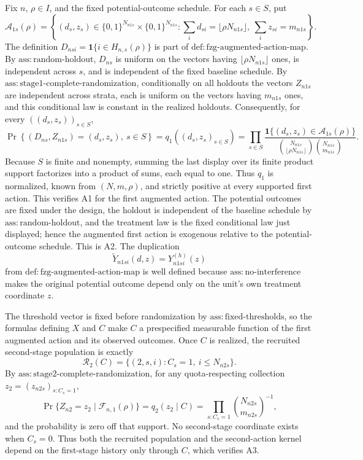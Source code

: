 Fix \(n\), \(\rho\in I\), and the fixed potential-outcome schedule.  For each \(s\in S\), put
\[
\mathcal A_{1s}(\rho)=\left\{(d_s,z_s)\in\{0,1\}^{N_{n1s}}\times\{0,1\}^{N_{n1s}}:
\sum_i d_{si}=\lfloor\rho N_{n1s}\rfloor,
\ \sum_i z_{si}=m_{n1s}\right\}.
\]
The definition \(D_{nsi}=\mathbf 1\{i\in H_{n,s}(\rho)\}\) is part of \(\mathrm{def{:}fzg\mbox{-}augmented\mbox{-}action\mbox{-}map}\).  By \(\mathrm{ass{:}random\mbox{-}holdout}\), \(D_{ns}\) is uniform on the vectors having \(\lfloor\rho N_{n1s}\rfloor\) ones, is independent across \(s\), and is independent of the fixed baseline schedule.  By \(\mathrm{ass{:}stage1\mbox{-}complete\mbox{-}randomization}\), conditionally on all holdouts the vectors \(Z_{n1s}\) are independent across strata, each is uniform on the vectors having \(m_{n1s}\) ones, and this conditional law is constant in the realized holdouts.  Consequently, for every \(((d_s,z_s))_{s\in S}\),
\[
\Pr\!\left\{(D_{ns},Z_{n1s})=(d_s,z_s),\ s\in S\right\}
=q_1((d_s,z_s)_{s\in S})
=\prod_{s\in S}
\frac{\mathbf 1\{(d_s,z_s)\in\mathcal A_{1s}(\rho)\}}
{\binom{N_{n1s}}{\lfloor\rho N_{n1s}\rfloor}\binom{N_{n1s}}{m_{n1s}}}.
\]
Because \(S\) is finite and nonempty, summing the last display over its finite product support factorizes into a product of sums, each equal to one.  Thus \(q_1\) is normalized, known from \((N,m,\rho)\), and strictly positive at every supported first action.  This verifies A1 for the first augmented action.  The potential outcomes are fixed under the design, the holdout is independent of the baseline schedule by \(\mathrm{ass{:}random\mbox{-}holdout}\), and the treatment law is the fixed conditional law just displayed; hence the augmented first action is exogenous relative to the potential-outcome schedule.  This is A2.  The duplication
\[
\widetilde Y_{n1si}(d,z)=Y^{(h)}_{n1si}(z)
\]
from \(\mathrm{def{:}fzg\mbox{-}augmented\mbox{-}action\mbox{-}map}\) is well defined because \(\mathrm{ass{:}no\mbox{-}interference}\) makes the original potential outcome depend only on the unit's own treatment coordinate \(z\).

The threshold vector is fixed before randomization by \(\mathrm{ass{:}fixed\mbox{-}thresholds}\), so the formulas defining \(X\) and \(C\) make \(C\) a prespecified measurable function of the first augmented action and its observed outcomes.  Once \(C\) is realized, the recruited second-stage population is exactly
\[
\mathcal R_2(C)=\{(2,s,i):C_s=1,\ i\le N_{n2s}\}.
\]
By \(\mathrm{ass{:}stage2\mbox{-}complete\mbox{-}randomization}\), for any quota-respecting collection \(z_2=(z_{n2s})_{s:C_s=1}\),
\[
\Pr\{Z_{n2}=z_2\mid\mathcal F_{n,1}(\rho)\}
=q_2(z_2\mid C)
=\prod_{s:C_s=1}\binom{N_{n2s}}{m_{n2s}}^{-1},
\]
and the probability is zero off that support.  No second-stage coordinate exists when \(C_s=0\).  Thus both the recruited population and the second-action kernel depend on the first-stage history only through \(C\), which verifies A3.

